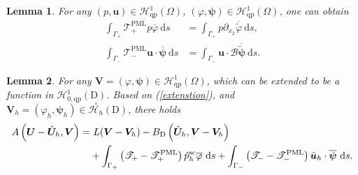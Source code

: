 \documentclass[10pt,a4paper]{amsart}
\newtheorem{lemma}{Lemma}
\begin{document}
\begin{lemma}\label{lemma5}
	For any $(p,\boldsymbol{u}) \in \mathscr{H}^1_\mathrm{qp}\left(\Omega\right)$, $(\varphi, \boldsymbol{\psi}) \in \mathscr{H}^1_\mathrm{qp}\left(\Omega\right)$, one can obtain
	\begin{align*}
		\int_{\Gamma_+} \mathscr{T}_+^{\mathrm{PML}} p  \overline{\varphi} \mathrm{~d} s &=\int_{\Gamma_+} p  \partial_{x_2} \overline{\tilde{\varphi}} \mathrm{~d} s,\\
		\int_{\Gamma_-} \mathscr{T}_-^{\mathrm{PML}} \boldsymbol{u} \cdot \overline{\boldsymbol{\psi}} \mathrm{~d} s &=\int_{\Gamma_-} \boldsymbol{u} \cdot \mathscr{B} \overline{\tilde{\boldsymbol{\psi}}} \mathrm{~d} s.
	\end{align*}
\end{lemma}

\begin{lemma}\label{errorformula}
	For any $\boldsymbol{V}=(\varphi,\boldsymbol{\psi}) \in \mathscr{H}^1_\mathrm{qp}\left(\Omega\right)$, which can be extended to be a function in $\mathscr{H}_{0,\mathrm{qp}}^1\left(\mathrm{D}\right)$. Based on (\ref{extenstion}), and $\boldsymbol{V}_h=(\varphi_h,\boldsymbol{\psi}_h) \in \stackrel{\circ}{\mathscr{H}_h}(\mathrm{D})$, there holds
	\begin{align}\label{lemm6}
		A\left(\boldsymbol{U}-\hat{\boldsymbol{U}}_{h}, \boldsymbol{V}\right)=&~ L(\boldsymbol{V}-\boldsymbol{V}_h)
		-B_\mathrm{D}\left(\hat{\boldsymbol{U}}_h,\boldsymbol{V}-\boldsymbol{V}_h\right) \notag \\
		&+ \int_{\Gamma_+}\left(\mathscr{T}_+-\mathscr{T}_+^{\mathrm{PML}}\right)\hat{p}^{\mathrm{sc}}_h \overline{\varphi} \mathrm{~d} s
		+\int_{\Gamma_-}\left(\mathscr{T}_--\mathscr{T}_-^{\mathrm{PML}}\right)\hat{\boldsymbol{u}}_h \cdot \overline{\boldsymbol{\psi}} \mathrm{~d} s.
	\end{align}
\end{lemma}
\end{document}
